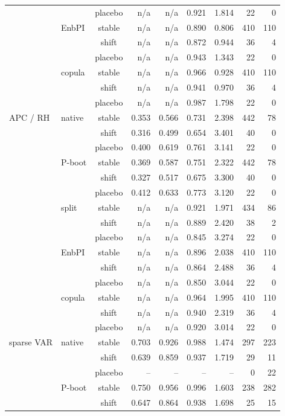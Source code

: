 {\begin{longtable}{@{}llcrrrrrr@{}}
 &  & placebo & n/a & n/a & 0.921 & 1.814 & 22 & 0 \\
 & EnbPI & stable & n/a & n/a & 0.890 & 0.806 & 410 & 110 \\
 &  & shift & n/a & n/a & 0.872 & 0.944 & 36 & 4 \\
 &  & placebo & n/a & n/a & 0.943 & 1.343 & 22 & 0 \\
 & copula & stable & n/a & n/a & 0.966 & 0.928 & 410 & 110 \\
 &  & shift & n/a & n/a & 0.941 & 0.970 & 36 & 4 \\
 &  & placebo & n/a & n/a & 0.987 & 1.798 & 22 & 0 \\
\addlinespace[2pt]
APC / RH & native & stable & 0.353 & 0.566 & 0.731 & 2.398 & 442 & 78 \\
 &  & shift & 0.316 & 0.499 & 0.654 & 3.401 & 40 & 0 \\
 &  & placebo & 0.400 & 0.619 & 0.761 & 3.141 & 22 & 0 \\
 & P-boot & stable & 0.369 & 0.587 & 0.751 & 2.322 & 442 & 78 \\
 &  & shift & 0.327 & 0.517 & 0.675 & 3.300 & 40 & 0 \\
 &  & placebo & 0.412 & 0.633 & 0.773 & 3.120 & 22 & 0 \\
 & split & stable & n/a & n/a & 0.921 & 1.971 & 434 & 86 \\
 &  & shift & n/a & n/a & 0.889 & 2.420 & 38 & 2 \\
 &  & placebo & n/a & n/a & 0.845 & 3.274 & 22 & 0 \\
 & EnbPI & stable & n/a & n/a & 0.896 & 2.038 & 410 & 110 \\
 &  & shift & n/a & n/a & 0.864 & 2.488 & 36 & 4 \\
 &  & placebo & n/a & n/a & 0.850 & 3.044 & 22 & 0 \\
 & copula & stable & n/a & n/a & 0.964 & 1.995 & 410 & 110 \\
 &  & shift & n/a & n/a & 0.940 & 2.319 & 36 & 4 \\
 &  & placebo & n/a & n/a & 0.920 & 3.014 & 22 & 0 \\
\addlinespace[2pt]
sparse VAR & native & stable & 0.703 & 0.926 & 0.988 & 1.474 & 297 & 223 \\
 &  & shift & 0.639 & 0.859 & 0.937 & 1.719 & 29 & 11 \\
 &  & placebo & -- & -- & -- & -- & 0 & 22 \\
 & P-boot & stable & 0.750 & 0.956 & 0.996 & 1.603 & 238 & 282 \\
 &  & shift & 0.647 & 0.864 & 0.938 & 1.698 & 25 & 15 \\

\end{longtable}}
